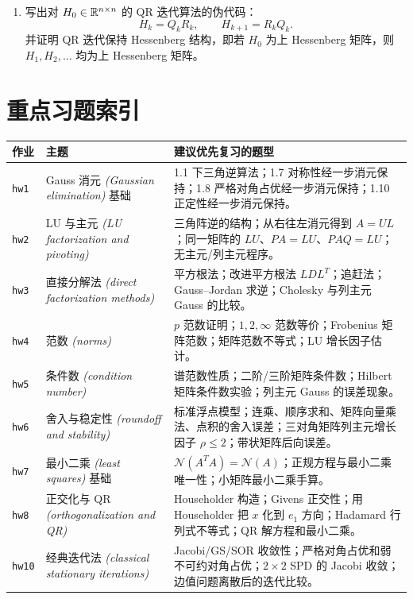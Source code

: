 \documentclass{article}
\newcommand{\eng}[1]{\texorpdfstring{{\normalfont\rmfamily\itshape\textcolor{blue!65!black}{(#1)}}}{(#1)}}
\begin{document}
\begin{enumerate}
  \item 写出对 $H_0\in\mathbb{R}^{n\times n}$ 的 QR 迭代算法的伪代码：
  \[
    H_k=Q_kR_k,\qquad H_{k+1}=R_kQ_k.
  \]
  并证明 QR 迭代保持 Hessenberg 结构，即若 $H_0$ 为上 Hessenberg 矩阵，则
  $H_1,H_2,\dots$ 均为上 Hessenberg 矩阵。
\end{enumerate}

\section{重点习题索引}

\begin{longtable}{@{}p{1.4cm}p{4.1cm}p{8.5cm}@{}}
\toprule
\textbf{作业} & \textbf{主题} & \textbf{建议优先复习的题型}\\
\midrule
\endhead
\texttt{hw1} & Gauss 消元 \eng{Gaussian elimination} 基础 & 1.1 下三角逆算法；1.7 对称性经一步消元保持；1.8 严格对角占优经一步消元保持；1.10 正定性经一步消元保持。\\
\texttt{hw2} & LU 与主元 \eng{LU factorization and pivoting} & 三角阵逆的结构；从右往左消元得到 $A=UL$；同一矩阵的 $LU$、$PA=LU$、$PAQ=LU$；无主元/列主元程序。\\
\texttt{hw3} & 直接分解法 \eng{direct factorization methods} & 平方根法；改进平方根法 $LDL^T$；追赶法；Gauss--Jordan 求逆；Cholesky 与列主元 Gauss 的比较。\\
\texttt{hw4} & 范数 \eng{norms} & $p$ 范数证明；$1,2,\infty$ 范数等价；Frobenius 矩阵范数；矩阵范数不等式；LU 增长因子估计。\\
\texttt{hw5} & 条件数 \eng{condition number} & 谱范数性质；二阶/三阶矩阵条件数；Hilbert 矩阵条件数实验；列主元 Gauss 的误差现象。\\
\texttt{hw6} & 舍入与稳定性 \eng{roundoff and stability} & 标准浮点模型；连乘、顺序求和、矩阵向量乘法、点积的舍入误差；三对角矩阵列主元增长因子 $\rho\le2$；带状矩阵后向误差。\\
\texttt{hw7} & 最小二乘 \eng{least squares} 基础 & $\mathcal N(A^TA)=\mathcal N(A)$；正规方程与最小二乘唯一性；小矩阵最小二乘手算。\\
\texttt{hw8} & 正交化与 QR \eng{orthogonalization and QR} & Householder 构造；Givens 正交性；用 Householder 把 $x$ 化到 $e_1$ 方向；Hadamard 行列式不等式；QR 解方程和最小二乘。\\
\texttt{hw10} & 经典迭代法 \eng{classical stationary iterations} & Jacobi/GS/SOR 收敛性；严格对角占优和弱不可约对角占优；$2\times2$ SPD 的 Jacobi 收敛；边值问题离散后的迭代比较。\\

\end{longtable}
\end{document}
